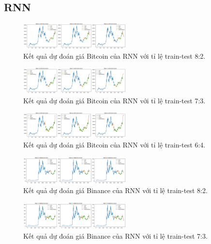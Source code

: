 \documentclass{ieeeojies}
\begin{document}
\subsection{RNN}
\begin{figure}[h]
    \centering
    \includegraphics[width=0.5\textwidth]{bibliography/pictures/RNNbtc8_2.png}
    \caption{Kết quả dự đoán giá Bitcoin của RNN với tỉ lệ train-test 8:2.}
\end{figure}
\begin{figure}[h]
    \centering
    \includegraphics[width=0.5\textwidth]{bibliography/pictures/RNNbtc7_3.png}
    \caption{Kết quả dự đoán giá Bitcoin của RNN với tỉ lệ train-test 7:3.}
\end{figure}
\begin{figure}[h]
    \centering
    \includegraphics[width=0.5\textwidth]{bibliography/pictures/RNNbtc6_4.png}
    \caption{Kết quả dự đoán giá Bitcoin của RNN với tỉ lệ train-test 6:4.}
\end{figure}
\begin{figure}[h]
    \centering
    \includegraphics[width=0.5\textwidth]{bibliography/pictures/RNNbnb8_2.png}
    \caption{Kết quả dự đoán giá Binance của RNN với tỉ lệ train-test 8:2.}
\end{figure}
\begin{figure}[h]
    \centering
    \includegraphics[width=0.5\textwidth]{bibliography/pictures/RNNbnb7_3.png}
    \caption{Kết quả dự đoán giá Binance của RNN với tỉ lệ train-test 7:3.}
\end{figure}
\end{document}
